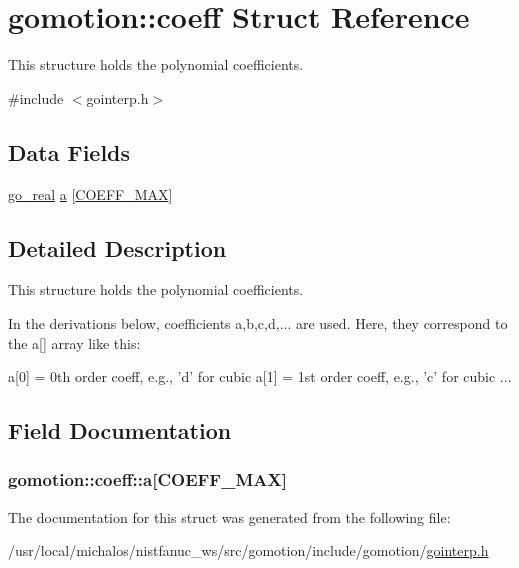 \hypertarget{structgomotion_1_1coeff}{\section{gomotion\-:\-:coeff Struct Reference}
\label{structgomotion_1_1coeff}
}


This structure holds the polynomial coefficients.  




{\ttfamily \#include $<$gointerp.\-h$>$}

\subsection*{Data Fields}
\begin{DoxyCompactItemize}
\item 
\hyperlink{gotypes_8h_afd666a2393eebd71ee455846ac9def9b}{go\-\_\-real} \hyperlink{structgomotion_1_1coeff_ad555cca07d6795172dfc62716a5d5261}{a} \mbox{[}\hyperlink{namespacegomotion_ada59e79a297fc10f2dbc85e4777fa4aea0d345844cda261ed2253d7fc9404e2ef}{C\-O\-E\-F\-F\-\_\-\-M\-A\-X}\mbox{]}
\end{DoxyCompactItemize}


\subsection{Detailed Description}
This structure holds the polynomial coefficients. 

In the derivations below, coefficients a,b,c,d,... are used. Here, they correspond to the a\mbox{[}\mbox{]} array like this\-:

a\mbox{[}0\mbox{]} = 0th order coeff, e.\-g., 'd' for cubic a\mbox{[}1\mbox{]} = 1st order coeff, e.\-g., 'c' for cubic ... 

\subsection{Field Documentation}
\hypertarget{structgomotion_1_1coeff_ad555cca07d6795172dfc62716a5d5261}{
\subsubsection[{a}]{ gomotion\-::coeff\-::a\mbox{[}{\bf C\-O\-E\-F\-F\-\_\-\-M\-A\-X}\mbox{]}}}\label{structgomotion_1_1coeff_ad555cca07d6795172dfc62716a5d5261}


The documentation for this struct was generated from the following file\-:\begin{DoxyCompactItemize}
\item 
/usr/local/michalos/nistfanuc\-\_\-ws/src/gomotion/include/gomotion/\hyperlink{gointerp_8h}{gointerp.\-h}\end{DoxyCompactItemize}
